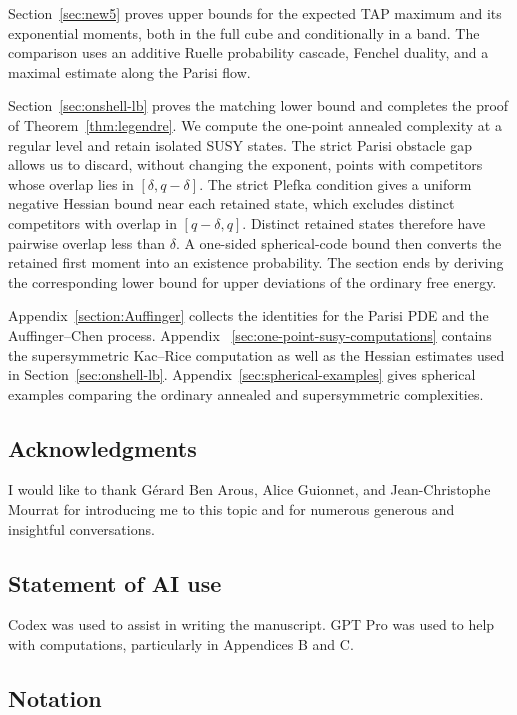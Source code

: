 \documentclass[a4paper,10pt,reqno]{amsart}
\numberwithin{equation}{section}
\begin{document}
	Section~\ref{sec:new5} proves upper bounds for the expected TAP maximum and
	its exponential moments, both in the full cube and conditionally in a band.
	The comparison uses an additive Ruelle probability cascade, Fenchel duality,
	and a maximal estimate along the Parisi flow.
	
	Section~\ref{sec:onshell-lb} proves the matching lower bound and completes
	the proof of Theorem~\ref{thm:legendre}. We compute the one-point annealed
	complexity at a regular level and retain isolated SUSY states. The strict
	Parisi obstacle gap allows us to discard, without changing the exponent,
	points with competitors whose overlap lies in $[\delta,q-\delta]$. The
	strict Plefka condition gives a uniform negative Hessian bound near each
	retained state, which excludes distinct competitors with overlap in
	$[q-\delta,q]$. Distinct retained states therefore have pairwise overlap
	less than $\delta$. A one-sided spherical-code bound then converts the
	retained first moment into an existence probability. The section ends by
	deriving the corresponding lower bound for upper deviations of the
	ordinary free energy.
	
	Appendix~\ref{section:Auffinger} collects the identities for the Parisi PDE and
	the Auffinger--Chen process. Appendix~
	\ref{sec:one-point-susy-computations} contains the supersymmetric Kac--Rice
	computation as well as the Hessian estimates used in
	Section~\ref{sec:onshell-lb}.
	Appendix~\ref{sec:spherical-examples} gives spherical examples comparing the ordinary
	annealed and supersymmetric complexities.
	
	\subsection*{Acknowledgments}
	
	I would like to thank Gérard Ben Arous, Alice Guionnet, and
	Jean-Christophe Mourrat for introducing me to this topic and for numerous
	generous and insightful conversations.
	
	\subsection{Statement of AI use}
	Codex was used to assist in writing the manuscript. GPT Pro was used to help with computations, particularly in Appendices B and C.
	
	\subsection{Notation}\label{sub:notation}
	
\end{document}
